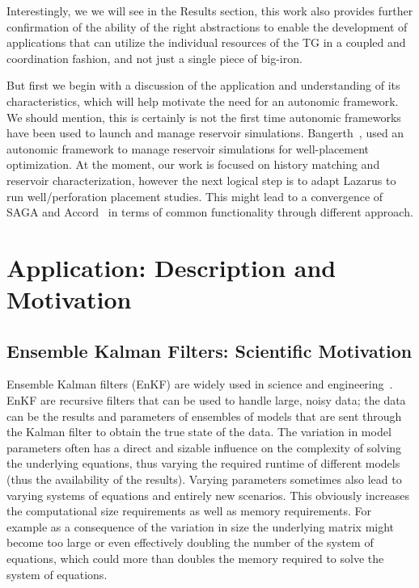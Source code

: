 \documentclass{sig-alternate}
\newcommand{\jhanote}[1]{ {\textcolor{red} { ***Jha: #1 }}}
\newcommand{\jhanote}[1]{}
\begin{document}
Interestingly, we we will see in the Results section, this work also
provides further confirmation of the ability of the right abstractions
to enable the development of applications that can utilize the
individual resources of the TG in a coupled and coordination
fashion, and not just a single piece of big-iron.

But first we begin with a discussion of the application and
understanding of its characteristics, which will help motivate the
need for an autonomic framework. We should mention, this is certainly
is not the first time autonomic frameworks have been used to launch
and manage reservoir simulations. Bangerth~\cite{bangerth}, used an
autonomic framework to manage reservoir simulations for well-placement
optimization. At the moment, our work is focused on history matching
and reservoir characterization, however the next logical step is to
adapt Lazarus to run well/perforation placement studies. This might
lead to a convergence of SAGA and Accord~\cite{accord} in terms of
common functionality through different approach.



\section{Application: Description and Motivation} 

\subsection{Ensemble Kalman Filters: Scientific Motivation}

Ensemble Kalman filters (EnKF) are widely used in science and
engineering~\cite{DataAssim, KalmanPaper}. EnKF are recursive filters
that can be used to handle large, noisy data; the data can be the
results and parameters of ensembles of models that are sent through
the Kalman filter to obtain the true state of the data. The variation
in model parameters often has a direct and sizable influence on the
complexity of solving the underlying equations, thus varying the
required runtime of different models (thus the availability of the
results).  Varying parameters sometimes also lead to varying systems
of equations and entirely new scenarios. This obviously increases the
computational size requirements as well as memory requirements.  For
example as a consequence of the variation in size the underlying
matrix might become too large or even effectively doubling the number
of the system of equations, which could more than doubles the memory
required to solve the system of equations.
\end{document}
